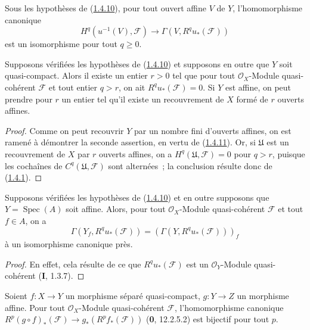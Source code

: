 \begin{corollary}[1.4.11]
\label{III.1.4.11-fr}
Sous les hypothèses de \textup{(\hyperref[III.1.4.10-fr]{1.4.10})}, pour tout ouvert
affine $V$ de $Y$, l'homomorphisme canonique
\begin{equation}
\label{III.1.4.11.1-fr}
\tag{1.4.11.1}
H^q(u^{-1}(V),\mathcal F)\longrightarrow
\Gamma(V,R^qu_*(\mathcal F))
\end{equation}
est un isomorphisme pour tout $q\geq0$.
\end{corollary}

\begin{corollary}[1.4.12]
\label{III.1.4.12-fr}
Supposons vérifiées les hypothèses de
\textup{(\hyperref[III.1.4.10-fr]{1.4.10})} et supposons en outre que $Y$ soit
quasi-compact. Alors il existe un entier $r>0$ tel que pour tout
$\mathcal O_X$-Module quasi-cohérent $\mathcal F$ et tout entier $q>r$, on
ait $R^qu_*(\mathcal F)=0$. Si $Y$ est affine, on peut prendre pour $r$ un
entier tel qu'il existe un recouvrement de $X$ formé de $r$ ouverts affines.
\end{corollary}

\begin{proof}
Comme on peut recouvrir $Y$ par un nombre fini d'ouverts affines, on est
ramené à démontrer la seconde assertion, en vertu de
(\hyperref[III.1.4.11-fr]{1.4.11}). Or, si $\mathfrak U$ est un
recouvrement de $X$ par $r$ ouverts affines, on a
$H^q(\mathfrak U,\mathcal F)=0$ pour $q>r$, puisque les cochaînes de
$C^q(\mathfrak U,\mathcal F)$ sont alternées~; la conclusion résulte donc de
(\hyperref[III.1.4.1-fr]{1.4.1}).
\end{proof}

\begin{corollary}[1.4.13]
\label{III.1.4.13-fr}
Supposons vérifiées les hypothèses de
\textup{(\hyperref[III.1.4.10-fr]{1.4.10})} et en outre supposons que
$Y=\operatorname{Spec}(A)$ soit affine. Alors, pour tout
$\mathcal O_X$-Module quasi-cohérent $\mathcal F$ et tout $f\in A$, on a
\[
\Gamma(Y_f,R^qu_*(\mathcal F))
=(\Gamma(Y,R^qu_*(\mathcal F)))_f
\]
à un isomorphisme canonique près.
\end{corollary}

\begin{proof}
En effet, cela résulte de ce que $R^qu_*(\mathcal F)$ est un
$\mathcal O_Y$-Module quasi-cohérent (\textbf{I}, 1.3.7).
\end{proof}

\begin{proposition}[1.4.14]
\label{III.1.4.14-fr}
Soient $f:X\to Y$ un morphisme séparé quasi-compact, $g:Y\to Z$ un
morphisme affine. Pour tout $\mathcal O_X$-Module quasi-cohérent
$\mathcal F$, l'homomorphisme canonique
$R^p(g\circ f)_*(\mathcal F)\to g_*(R^pf_*(\mathcal F))$ \textup{(\textbf{0}, 12.2.5.2)} est
bijectif pour tout $p$.
\end{proposition}

